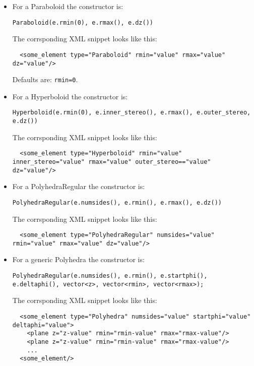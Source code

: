 \begin{itemize}
\item For a Paraboloid the constructor is:
\begin{verbatim}
Paraboloid(e.rmin(0), e.rmax(), e.dz())
\end{verbatim}
The corrsponding XML snippet looks like this:
\begin{verbatim}
  <some_element type="Paraboloid" rmin="value" rmax="value" dz="value"/>
\end{verbatim}
Defaults are: \texttt{rmin=0}.

\item For a Hyperboloid the constructor is:
\begin{verbatim}
Hyperboloid(e.rmin(0), e.inner_stereo(), e.rmax(), e.outer_stereo, e.dz())
\end{verbatim}
The corrsponding XML snippet looks like this:
\begin{verbatim}
  <some_element type="Hyperboloid" rmin="value" inner_stereo="value" rmax="value" outer_stereo=="value" dz="value"/>
\end{verbatim}

\item For a PolyhedraRegular the constructor is:
\begin{verbatim}
PolyhedraRegular(e.numsides(), e.rmin(), e.rmax(), e.dz())
\end{verbatim}
The corrsponding XML snippet looks like this:
\begin{verbatim}
  <some_element type="PolyhedraRegular" numsides="value" rmin="value" rmax="value" dz="value"/>
\end{verbatim}

\item For a generic Polyhedra the constructor is:
\begin{verbatim}
PolyhedraRegular(e.numsides(), e.rmin(), e.startphi(), e.deltaphi(), vector<z>, vector<rmin>, vector<rmax>);
\end{verbatim}
The corrsponding XML snippet looks like this:
\begin{verbatim}
  <some_element type="Polyhedra" numsides="value" startphi="value" deltaphi="value">
    <plane z="z-value" rmin="rmin-value" rmax="rmax-value"/>
    <plane z="z-value" rmin="rmin-value" rmax="rmax-value"/>
    ...
  <some_element/>
\end{verbatim}


\end{itemize}
